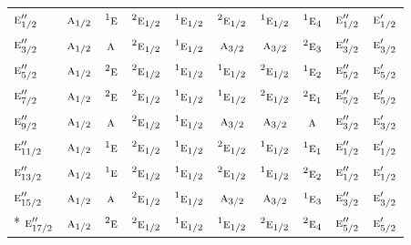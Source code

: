 \documentclass[10pt,a4paper]{article}
\numberwithin{equation}{section}
\newcommand{\irr}[1]{\text{\normalfont\scshape #1}}
\newcommand{\conjpair}[1]{{}^{#1}}
\begin{document}
{\begin{longtable}{@{}lccccccccc@{}}
$\irr{e}_{1/2}''$ & $\irr{a}_{1/2}$ & $\conjpair{1}\irr{e}$ & $\conjpair{2}\irr{e}_{1/2}$ & $\conjpair{1}\irr{e}_{1/2}$ & $\conjpair{2}\irr{e}_{1/2}$ & $\conjpair{1}\irr{e}_{1/2}$ & $\conjpair{1}\irr{e}_{4}$ & $\irr{e}_{1/2}''$ & $\irr{e}_{1/2}'$\\
$\irr{e}_{3/2}''$ & $\irr{a}_{1/2}$ & $\irr{a}$ & $\conjpair{2}\irr{e}_{1/2}$ & $\conjpair{1}\irr{e}_{1/2}$ & $\irr{a}_{3/2}$ & $\irr{a}_{3/2}$ & $\conjpair{2}\irr{e}_{3}$ & $\irr{e}_{3/2}''$ & $\irr{e}_{3/2}'$\\
$\irr{e}_{5/2}''$ & $\irr{a}_{1/2}$ & $\conjpair{2}\irr{e}$ & $\conjpair{2}\irr{e}_{1/2}$ & $\conjpair{1}\irr{e}_{1/2}$ & $\conjpair{1}\irr{e}_{1/2}$ & $\conjpair{2}\irr{e}_{1/2}$ & $\conjpair{1}\irr{e}_{2}$ & $\irr{e}_{5/2}''$ & $\irr{e}_{5/2}'$\\
$\irr{e}_{7/2}''$ & $\irr{a}_{1/2}$ & $\conjpair{2}\irr{e}$ & $\conjpair{2}\irr{e}_{1/2}$ & $\conjpair{1}\irr{e}_{1/2}$ & $\conjpair{1}\irr{e}_{1/2}$ & $\conjpair{2}\irr{e}_{1/2}$ & $\conjpair{2}\irr{e}_{1}$ & $\irr{e}_{5/2}''$ & $\irr{e}_{5/2}'$\\
$\irr{e}_{9/2}''$ & $\irr{a}_{1/2}$ & $\irr{a}$ & $\conjpair{2}\irr{e}_{1/2}$ & $\conjpair{1}\irr{e}_{1/2}$ & $\irr{a}_{3/2}$ & $\irr{a}_{3/2}$ & $\irr{a}$ & $\irr{e}_{3/2}''$ & $\irr{e}_{3/2}'$\\
$\irr{e}_{11/2}''$ & $\irr{a}_{1/2}$ & $\conjpair{1}\irr{e}$ & $\conjpair{2}\irr{e}_{1/2}$ & $\conjpair{1}\irr{e}_{1/2}$ & $\conjpair{2}\irr{e}_{1/2}$ & $\conjpair{1}\irr{e}_{1/2}$ & $\conjpair{1}\irr{e}_{1}$ & $\irr{e}_{1/2}''$ & $\irr{e}_{1/2}'$\\
$\irr{e}_{13/2}''$ & $\irr{a}_{1/2}$ & $\conjpair{1}\irr{e}$ & $\conjpair{2}\irr{e}_{1/2}$ & $\conjpair{1}\irr{e}_{1/2}$ & $\conjpair{2}\irr{e}_{1/2}$ & $\conjpair{1}\irr{e}_{1/2}$ & $\conjpair{2}\irr{e}_{2}$ & $\irr{e}_{1/2}''$ & $\irr{e}_{1/2}'$\\
$\irr{e}_{15/2}''$ & $\irr{a}_{1/2}$ & $\irr{a}$ & $\conjpair{2}\irr{e}_{1/2}$ & $\conjpair{1}\irr{e}_{1/2}$ & $\irr{a}_{3/2}$ & $\irr{a}_{3/2}$ & $\conjpair{1}\irr{e}_{3}$ & $\irr{e}_{3/2}''$ & $\irr{e}_{3/2}'$\\*
$\irr{e}_{17/2}''$ & $\irr{a}_{1/2}$ & $\conjpair{2}\irr{e}$ & $\conjpair{2}\irr{e}_{1/2}$ & $\conjpair{1}\irr{e}_{1/2}$ & $\conjpair{1}\irr{e}_{1/2}$ & $\conjpair{2}\irr{e}_{1/2}$ & $\conjpair{2}\irr{e}_{4}$ & $\irr{e}_{5/2}''$ & $\irr{e}_{5/2}'$\\
\bottomrule\end{longtable}}
\end{document}
